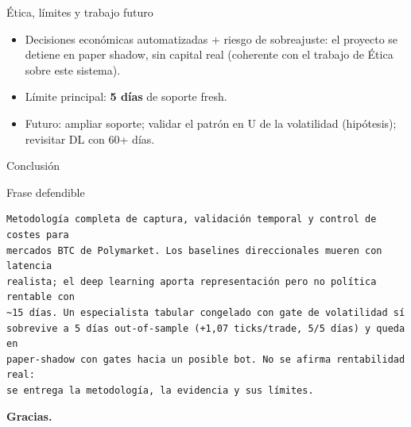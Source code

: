 \documentclass[aspectratio=169,11pt]{beamer}
\begin{document}
\begin{frame}{Ética, límites y trabajo futuro}
  \begin{itemize}
    \item Decisiones económicas automatizadas + riesgo de sobreajuste: el proyecto
      se detiene en paper shadow, sin capital real (coherente con el trabajo de
      Ética sobre este sistema).
    \item Límite principal: \textbf{5 días} de soporte fresh.
    \item Futuro: ampliar soporte; validar el patrón en U de la volatilidad
      (hipótesis); revisitar DL con 60+ días.
  \end{itemize}
\end{frame}

\begin{frame}[fragile]{Conclusión}
  \footnotesize
  \begin{block}{Frase defendible}
\begin{verbatim}
Metodología completa de captura, validación temporal y control de costes para
mercados BTC de Polymarket. Los baselines direccionales mueren con latencia
realista; el deep learning aporta representación pero no política rentable con
~15 días. Un especialista tabular congelado con gate de volatilidad sí
sobrevive a 5 días out-of-sample (+1,07 ticks/trade, 5/5 días) y queda en
paper-shadow con gates hacia un posible bot. No se afirma rentabilidad real:
se entrega la metodología, la evidencia y sus límites.
\end{verbatim}
  \end{block}
  \centering \normalsize \textbf{Gracias.}
\end{frame}
\end{document}
